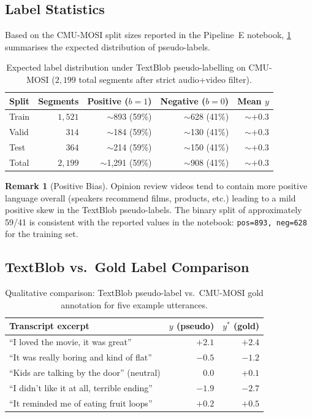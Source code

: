 \documentclass[12pt,a4paper]{article}
\theoremstyle{plain}
\theoremstyle{definition}
\newtheorem{remark}[theorem]{Remark}
\begin{document}
\subsection{Label Statistics}

Based on the CMU-MOSI split sizes reported in the Pipeline~E notebook,
\cref{tab:stats} summarises the expected distribution of pseudo-labels.

\begin{table}[H]
\centering
\caption{Expected label distribution under TextBlob pseudo-labelling
         on CMU-MOSI ($2{,}199$ total segments after strict
         audio+video filter).}
\label{tab:stats}
\begin{tabular}{lrrrr}
\toprule
Split & Segments & Positive ($b=1$) & Negative ($b=0$) & Mean $y$ \\
\midrule
Train & $1{,}521$ & $\sim$893 (59\%) & $\sim$628 (41\%) & $\sim$$+0.3$ \\
Valid & $\;\;\;314$ & $\sim$184 (59\%) & $\sim$130 (41\%) & $\sim$$+0.3$ \\
Test  & $\;\;\;364$ & $\sim$214 (59\%) & $\sim$150 (41\%) & $\sim$$+0.3$ \\
\midrule
Total & $2{,}199$ & $\sim$1,291 (59\%) & $\sim$908 (41\%) & $\sim$$+0.3$ \\
\bottomrule
\end{tabular}
\end{table}

\begin{remark}[Positive Bias]
  Opinion review videos tend to contain more positive language overall
  (speakers recommend films, products, etc.) leading to a mild positive
  skew in the TextBlob pseudo-labels.  The binary split of approximately
  59/41 is consistent with the reported values in the notebook:
  \texttt{pos=893, neg=628} for the training set.
\end{remark}

\subsection{TextBlob vs.\ Gold Label Comparison}

\begin{table}[H]
\centering
\caption{Qualitative comparison: TextBlob pseudo-label vs.\ CMU-MOSI
         gold annotation for five example utterances.}
\label{tab:comparison}
\begin{tabular}{p{8cm}rr}
\toprule
Transcript excerpt & $y$ (pseudo) & $y^*$ (gold) \\
\midrule
``I loved the movie, it was great'' & $+2.1$ & $+2.4$ \\
``It was really boring and kind of flat'' & $-0.5$ & $-1.2$ \\
``Kids are talking by the door'' (neutral) & $0.0$ & $+0.1$ \\
``I didn't like it at all, terrible ending'' & $-1.9$ & $-2.7$ \\
``It reminded me of eating fruit loops'' & $+0.2$ & $+0.5$ \\
\bottomrule
\end{tabular}
\end{table}
\end{document}
